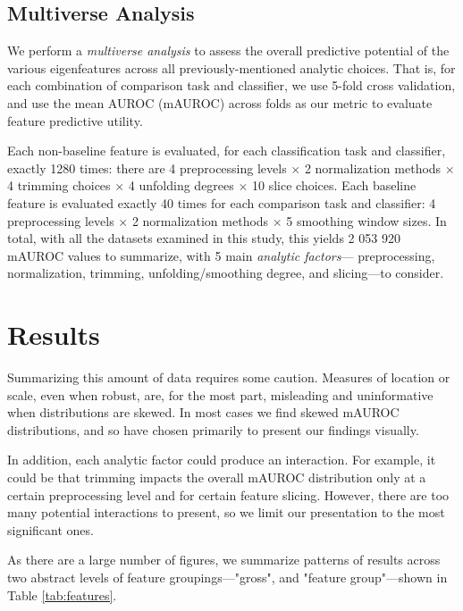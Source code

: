 \documentclass[12pt]{spieman}  %
\begin{document}
\begin{spacing}{2}
\subsection{Multiverse Analysis}
\label{sec:multiverse}

We perform a \textit{multiverse
analysis}\cite{steegenIncreasingTransparencyMultiverse2016} to assess the
overall predictive potential of the various eigenfeatures across all
previously-mentioned analytic choices. That is, for each combination of
comparison task and classifier, we use 5-fold cross validation, and use the
mean AUROC (mAUROC) across folds as our metric to evaluate feature predictive utility.

Each non-baseline feature is evaluated, for each classification task and
classifier, exactly 1280 times: there are 4 preprocessing levels \(\times\) 2
normalization methods \(\times\) 4 trimming choices \(\times\) 4 unfolding
degrees  \(\times\) 10 slice choices. Each baseline feature is evaluated
exactly 40 times for each comparison task and classifier: 4 preprocessing
levels \(\times\) 2 normalization methods \(\times\) 5 smoothing window sizes.
In total, with all the datasets examined in this study, this yields 2 053 920
mAUROC values to summarize, with 5 main \textit{analytic factors}—
preprocessing, normalization, trimming, unfolding/smoothing degree, and
slicing—to consider.

\section{Results}
\label{sec:results}

Summarizing this amount of data requires some caution. Measures of location or
scale, even when robust, are, for the most part, misleading and uninformative
when distributions are skewed. In most cases we find skewed mAUROC distributions,
and so have chosen primarily to present our findings visually.

In addition, each analytic factor could produce an interaction. For example, it
could be that trimming impacts the overall mAUROC distribution only at a
certain preprocessing level and for certain feature slicing. However, there are
too many potential interactions to present, so we limit our presentation
to the most significant ones.

As there are a large number of figures, we summarize patterns of results across
two abstract levels of feature groupings—"gross", and "feature group"—shown in
Table \ref{tab:features}.


\end{spacing}
\end{document}
